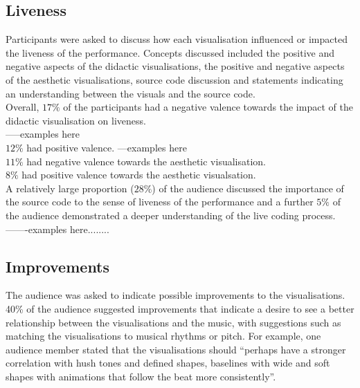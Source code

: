 \documentclass[12pt]{article}
\begin{document}
\subsection{Liveness}

Participants were asked to discuss how each visualisation influenced or impacted the liveness of the performance. Concepts discussed included the positive and negative aspects of the didactic visualisations, the positive and negative aspects of the aesthetic visualisations, source code discussion and statements indicating an understanding between the visuals and the source code.\\

Overall, $17\%$ of the participants had a negative valence towards the impact of the didactic visualisation on liveness.\\

-----examples here\\

$12\%$ had positive valence. ---examples here\\

$11\%$ had negative valence towards the aesthetic visualisation.\\

$8\%$ had positive valence towards the aesthetic visualsation.\\

A relatively large proportion ($28\%$) of the audience discussed the importance of the source code to the sense of liveness of the performance and a further $5\%$ of the audience demonstrated a deeper understanding of the live coding process. -------examples here........\\

\subsection{Improvements}

The audience was asked to indicate possible improvements to the visualisations. 40\% of the audience suggested improvements that indicate a desire to see a better relationship between the visualisations and the music, with suggestions such as matching the visualisations to musical rhythms or pitch. For example, one audience member stated that the visualisations should ``perhaps have a stronger correlation with hush tones and defined shapes, baselines with wide and soft shapes with animations that follow the beat more consistently''.\\
\end{document}
